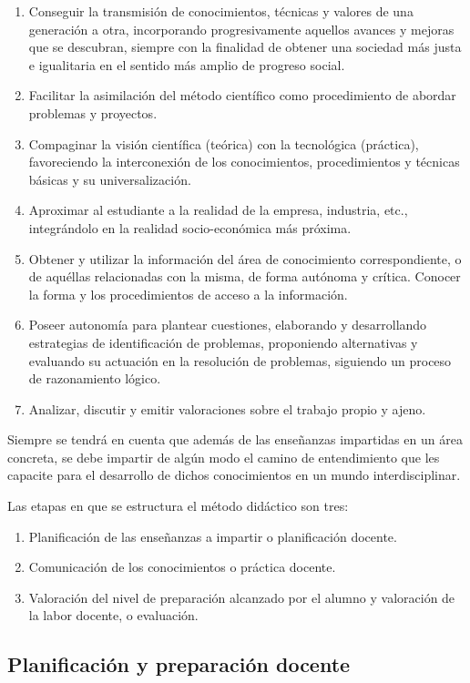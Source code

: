 \begin{enumerate}
\item	Conseguir la transmisión de conocimientos, técnicas y valores de una generación a otra, incorporando progresivamente aquellos avances y mejoras que se descubran, siempre con la finalidad de obtener una sociedad más justa e igualitaria en el sentido más amplio de progreso social.
\item	Facilitar la asimilación del método científico como procedimiento de abordar problemas y proyectos.
\item	Compaginar la visión científica (teórica) con la tecnológica (práctica), favoreciendo la interconexión de los conocimientos, procedimientos y técnicas básicas y su universalización.
\item	Aproximar al estudiante a la realidad de la empresa, industria, etc., integrándolo en la realidad socio-económica más próxima.
\item	Obtener y utilizar la información del área de conocimiento correspondiente, o de aquéllas relacionadas con la misma, de forma autónoma y crítica. Conocer la forma y los procedimientos de acceso a la información.
\item	Poseer autonomía para plantear cuestiones, elaborando y desarrollando estrategias de identificación de problemas, proponiendo alternativas y evaluando su actuación en la resolución de problemas, siguiendo un proceso de razonamiento lógico.
\item	Analizar, discutir y emitir valoraciones sobre el trabajo propio y ajeno.
\end{enumerate}

Siempre se tendrá en cuenta que además de las enseñanzas impartidas en un área concreta, se debe impartir de algún modo el camino de entendimiento que les capacite para el desarrollo de dichos conocimientos en un mundo interdisciplinar.

Las etapas en que se estructura el método didáctico son tres:
\begin{enumerate}
\item	Planificación de las enseñanzas a impartir o planificación docente.
\item	Comunicación de los conocimientos o práctica docente.
\item	Valoración del nivel de preparación alcanzado por el alumno y valoración de la labor docente, o evaluación.
\end{enumerate}


\subsection{Planificación y preparación docente} \label{sec:planificacion}

